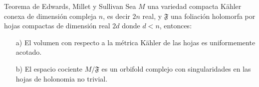\documentclass[letterpaper]{beamer}
\begin{document}
\begin{frame}
\begin{block}{Teorema de Edwards, Millet y Sullivan}\label{EMS}
        Sea $M$ una variedad compacta K\"ahler conexa de dimensi\'on compleja $n$, es decir $2n$ real, y $\mathfrak{F}$ una foliaci\'on holomorfa por hojas
        compactas de dimensi\'on real $2d$ donde $d<n$, entonces:
        \begin{enumerate}
                \item[a)] El volumen con respecto a la m\'etrica K\"ahler de las hojas es uniformemente acotado.
                \item[b)] El espacio cociente $M/\mathfrak{F}$ es un orbifold complejo con singularidades en las hojas de holonomia no trivial.
        \end{enumerate}
      \end{block}
\end{frame}
\end{document}

